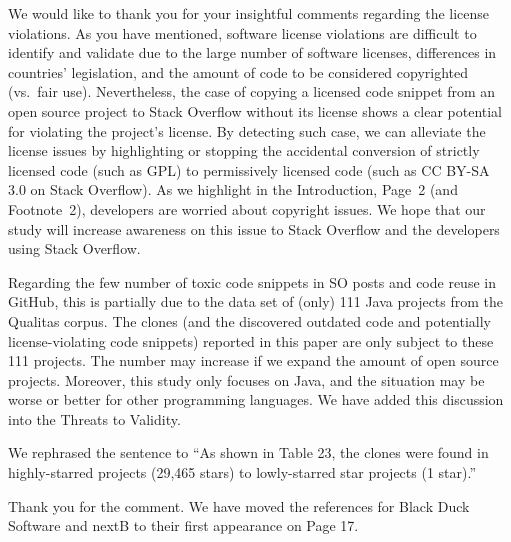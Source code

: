\documentclass[a4paper,twoside,10pt]{reviewresponse}
\begin{document}
We would like to thank you for your insightful comments regarding the license violations. As you have mentioned, software license violations are difficult to identify and validate due to the large number of software licenses, differences in countries' legislation, and the amount of code to be considered copyrighted (vs.~fair use). Nevertheless, the case of copying a licensed code snippet from an open source project to Stack Overflow without its license shows a clear potential for violating the project's license. By detecting such case, we can alleviate the license issues by highlighting or stopping the accidental conversion of strictly licensed code (such as GPL) to permissively licensed code (such as CC BY-SA 3.0 on Stack Overflow). As we highlight in the Introduction, Page~2 (and Footnote~2), developers are worried about copyright issues. We hope that our study will increase awareness on this issue to Stack Overflow and the developers using Stack Overflow.

Regarding the few number of toxic code snippets in SO posts and code reuse in GitHub, this is partially due to the data set of (only) 111 Java projects from the Qualitas corpus. The clones (and the discovered outdated code and potentially license-violating code snippets) reported in this paper are only subject to these 111 projects. The number may increase if we expand the amount of open source projects. Moreover, this study only focuses on Java, and the situation may be worse or better for other programming languages. We have added this discussion into the Threats to Validity.


We rephrased the sentence to ``As shown in Table 23, the clones were found in highly-starred projects (29,465 stars) to lowly-starred star projects (1 star).''


Thank you for the comment. We have moved the references for Black Duck Software and nextB to their first appearance on Page 17.
\end{document}
